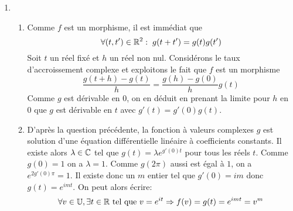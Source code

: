 \begin{enumerate}
\item
\begin{enumerate}
 \item Comme $f$ est un morphisme, il est immédiat que
\begin{displaymath}
 \forall (t,t')\in \mathbb{R}^2 :\; g(t+t')=g(t)g(t')
\end{displaymath}
Soit $t$ un réel fixé et $h$ un réel non nul. Considérons le taux d'accroissement complexe et exploitons le fait que $f$ est un morphisme
\begin{displaymath}
 \frac{g(t+h)-g(t)}{h}=\frac{g(h)-g(0)}{h}g(t)
\end{displaymath}
Comme $g$ est dérivable en $0$, on en déduit en prenant la limite pour $h$ en $0$ que $g$ est dérivable en $t$ avec $g'(t)=g'(0)g(t)$. 
\item D'après la question précédente, la fonction à valeurs complexes $g$ est solution d'une équation différentielle linéaire à coefficients constants. Il existe alors $\lambda\in \mathbb{C}$ tel que $g(t)=\lambda e^{g'(0)t}$ pour tous les réels $t$. Comme $g(0)=1$ on a $\lambda=1$. Comme $g(2\pi)$ aussi est égal à $1$, on a $e^{2g'(0)\pi}=1$. Il existe donc un $m$ entier tel que $g'(0)=im$ donc $g(t)=e^{imt}$. On peut alors écrire:
\begin{displaymath}
 \forall v\in \mathbb{U}, \exists t\in \mathbb{R} \text{ tel que } v=e^{it}\Rightarrow f(v)=g(t)=e^{imt}=v^m
\end{displaymath}
 
\end{enumerate}

\end{enumerate}
